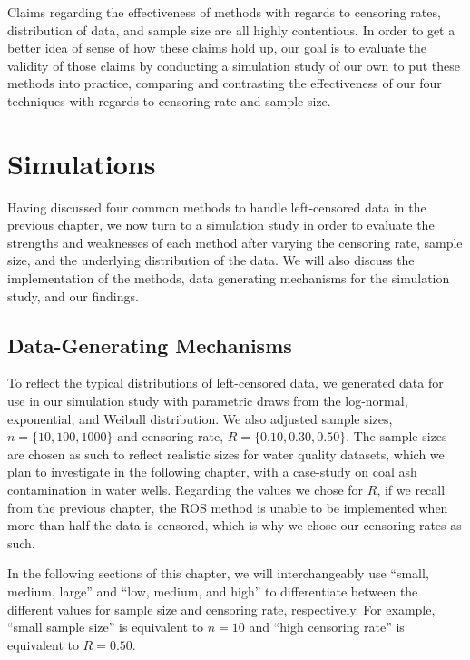 \documentclass[12pt, twoside]{amherstthesis}
\begin{document}
Claims regarding the effectiveness of methods with regards to censoring rates, distribution of data, and sample size are all highly contentious. In order to get a better idea of sense of how these claims hold up, our goal is to evaluate the validity of those claims by conducting a simulation study of our own to put these methods into practice, comparing and contrasting the effectiveness of our four techniques with regards to censoring rate and sample size.

\hypertarget{simulations}{%
\chapter{Simulations}\label{simulations}}

Having discussed four common methods to handle left-censored data in the previous chapter, we now turn to a simulation study in order to evaluate the strengths and weaknesses of each method after varying the censoring rate, sample size, and the underlying distribution of the data. We will also discuss the implementation of the methods, data generating mechanisms for the simulation study, and our findings.

\hypertarget{data_generating_mechanisms}{%
\section{Data-Generating Mechanisms}\label{data_generating_mechanisms}}

To reflect the typical distributions of left-censored data, we generated data for use in our simulation study with parametric draws from the log-normal, exponential, and Weibull distribution. We also adjusted sample sizes, \(n = \{10, 100, 1000\}\) and censoring rate, \(R = \{0.10, 0.30, 0.50\}\). The sample sizes are chosen as such to reflect realistic sizes for water quality datasets, which we plan to investigate in the following chapter, with a case-study on coal ash contamination in water wells. Regarding the values we chose for \(R\), if we recall from the previous chapter, the ROS method is unable to be implemented when more than half the data is censored, which is why we chose our censoring rates as such.

In the following sections of this chapter, we will interchangeably use ``small, medium, large'' and ``low, medium, and high'' to differentiate between the different values for sample size and censoring rate, respectively. For example, ``small sample size'' is equivalent to \(n = 10\) and ``high censoring rate'' is equivalent to \(R = {0.50}\).
\end{document}
